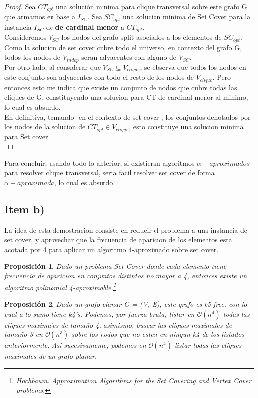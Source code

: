 \documentclass[10pt,a4paper]{article}
\newtheorem{proposition}{Proposici\'on}
\begin{document}
\begin{proof}
Sea $CT_{opt}$ una solución minima para clique transversal sobre este grafo G que armamos en base a $I_{SC}$. Sea $SC_{opt}$ una solucion minima de Set Cover para la instancia $I_{SC}$ de \textbf{de cardinal menor} a $CT_{opt}$.\\

Consideremos $V_{SC} $ los nodos del grafo split asociados a los elementos de $SC_{opt}$. Como la solucion de set cover cubre todo el universo, en contexto del grafo G, todos los nodos de $V_{indep}$ seran adyacentes con alguno de $V_{SC}$.\\
Por otro lado, al considerar que $ V_{SC} \subseteq V_{clique}$, se observa que todos los nodos en este conjunto son adyacentes con todo el resto de los nodos de $V_{clique}$. Pero entonces esto me indica que existe un conjunto de nodos que cubre todas las cliques de G, constituyendo una solucion para CT de cardinal menor al minimo, lo cual es absurdo. \\
En definitiva, tomando -en el contexto de set cover-, los conjuntos denotados por los nodos de la solucion de $CT_{opt} \in V_{clique}$, esto constituye una solucion minima para Set cover.\\
\end{proof}

Para concluir, usando todo lo anterior, si existieran algoritmos $\alpha-aproximados$ para resolver clique transversal, seria facil resolver set cover de forma $\alpha-aproximada$, lo cual es absurdo.

\subsection{Item b)}

La idea de esta demostracion consiste en reducir el problema a una instancia de set cover, y aprovechar que la frecuencia de aparicion de los elementos esta acotada por 4 para aplicar un algoritmo 4-aproximado sobre set cover.

\begin{proposition}
    Dado un problema Set-Cover donde cada elemento tiene frecuencia de aparicion en conjuntos distintos no mayor a 4, entonces existe un algoritmo polinomial 4-aproximable.\footnote{Hochbaum. Approximation Algorithms for the Set Covering and Vertex Cover problems.}
\end{proposition}

\begin{proposition}
Dado un grafo planar G = (V, E), este grafo es k5-free, con lo cual a lo sumo tiene k4's. Podemos, por fuerza bruta, listar en $\mathcal{O}(n^4)$ todas las cliques maximales de tamaño 4, asimismo, buscar las cliques maximales de tamaño 3 en $\mathcal{O}(n^3)$ sobre los nodos que no esten en ningun k4 de los listados anteriormente. Asi sucesivamente, podemos en $\mathcal{O}(n^4)$ listar todas las cliques maximales de un grafo planar.
\end{proposition}
\end{document}
